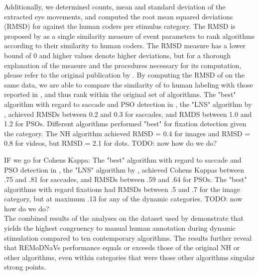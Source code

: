 Additionally, we determined counts, mean and standard deviation of the extracted eye movements, and computed the root mean squared deviations (RMSD) for \remodnav against the human coders per stimulus category. The RMSD is proposed by \cite{Andersson2017} as a single similarity measure of event parameters to rank algorithms according to their similarity to human coders. The RMSD measure has a lower bound of 0 and higher values denote higher deviations, but for a thorough explanation of the measure and the procedures necessary for its computation, please refer to the original publication by \cite{Andersson2017}. By computing the RMSD of \remodnav on the same data, we are able to compare the similarity of \remodnav to human labeling with those reported in \cite{Andersson2017}, and thus rank \remodnav within the original set of algorithms. 
The "best" algorithm with regard to saccade and PSO detection in \cite{Andersson2017}, the "LNS" algorithm by \cite{Larsson2013}, achieved RMSDs between 0.2 and 0.3 for saccades, and RMDS between 1.0 and 1.2 for PSOs. Different algorithms performed "best" for fixation detection given the category. The NH algorithm achieved RMSD = 0.4 for images and RMSD = 0.8 for videos, but RMSD = 2.1 for dots. TODO: now how do we do?

IF we go for Cohens Kappa: The "best" algorithm with regard to saccade and PSO detection in \cite{Andersson2017}, the "LNS" algorithm by \cite{Larsson2013}, achieved Cohens Kappas between .75 and .81 for saccades, and RMSDs between .59 and .64 for PSOs. The "best" algorithms with regard fixations had RMSDs between .5 and .7 for the image category, but at maximum .13 for any of the dynamic categories. TODO: now how do we do? \\

The combined results of the analyses on the dataset used by \citet{Andersson2017} demonstrate that \remodnav yields the highest congruency to manual human annotation during dynamic stimulation compared to ten contemporary algorithms. The results further reveal that REMoDNaVs performance equals or exceeds those of the original NH or other algorithms, even within categories that were those other algorithms singular strong points.





